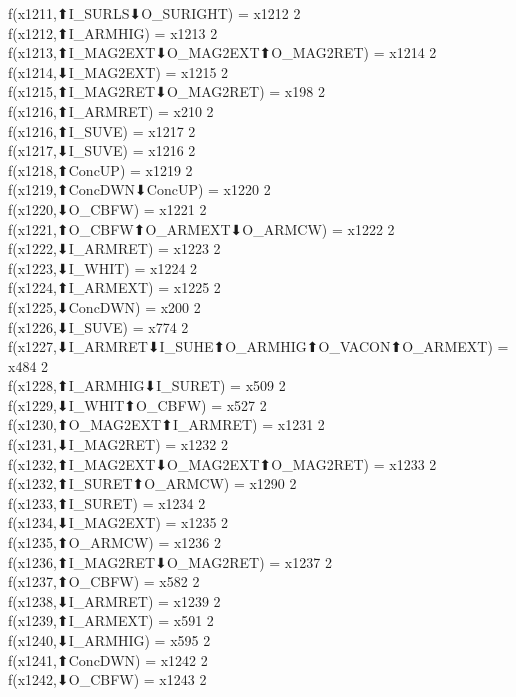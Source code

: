 f(x1211,⬆I_SURLS⬇O_SURIGHT) = x1212 {2} \\
f(x1212,⬆I_ARMHIG) = x1213 {2} \\
f(x1213,⬆I_MAG2EXT⬇O_MAG2EXT⬆O_MAG2RET) = x1214 {2} \\
f(x1214,⬇I_MAG2EXT) = x1215 {2} \\
f(x1215,⬆I_MAG2RET⬇O_MAG2RET) = x198 {2} \\
f(x1216,⬆I_ARMRET) = x210 {2} \\
f(x1216,⬆I_SUVE) = x1217 {2} \\
f(x1217,⬇I_SUVE) = x1216 {2} \\
f(x1218,⬆ConcUP) = x1219 {2} \\
f(x1219,⬆ConcDWN⬇ConcUP) = x1220 {2} \\
f(x1220,⬇O_CBFW) = x1221 {2} \\
f(x1221,⬆O_CBFW⬆O_ARMEXT⬇O_ARMCW) = x1222 {2} \\
f(x1222,⬇I_ARMRET) = x1223 {2} \\
f(x1223,⬇I_WHIT) = x1224 {2} \\
f(x1224,⬆I_ARMEXT) = x1225 {2} \\
f(x1225,⬇ConcDWN) = x200 {2} \\
f(x1226,⬇I_SUVE) = x774 {2} \\
f(x1227,⬇I_ARMRET⬇I_SUHE⬆O_ARMHIG⬆O_VACON⬆O_ARMEXT) = x484 {2} \\
f(x1228,⬆I_ARMHIG⬇I_SURET) = x509 {2} \\
f(x1229,⬇I_WHIT⬆O_CBFW) = x527 {2} \\
f(x1230,⬆O_MAG2EXT⬆I_ARMRET) = x1231 {2} \\
f(x1231,⬇I_MAG2RET) = x1232 {2} \\
f(x1232,⬆I_MAG2EXT⬇O_MAG2EXT⬆O_MAG2RET) = x1233 {2} \\
f(x1232,⬆I_SURET⬆O_ARMCW) = x1290 {2} \\
f(x1233,⬆I_SURET) = x1234 {2} \\
f(x1234,⬇I_MAG2EXT) = x1235 {2} \\
f(x1235,⬆O_ARMCW) = x1236 {2} \\
f(x1236,⬆I_MAG2RET⬇O_MAG2RET) = x1237 {2} \\
f(x1237,⬆O_CBFW) = x582 {2} \\
f(x1238,⬇I_ARMRET) = x1239 {2} \\
f(x1239,⬆I_ARMEXT) = x591 {2} \\
f(x1240,⬇I_ARMHIG) = x595 {2} \\
f(x1241,⬆ConcDWN) = x1242 {2} \\
f(x1242,⬇O_CBFW) = x1243 {2} \\
